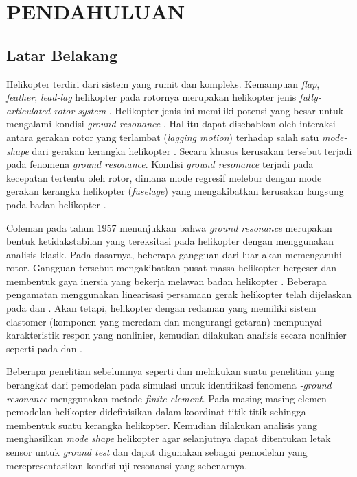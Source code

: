\chapter{PENDAHULUAN}
\label{chap:pendahuluan}

\section{Latar Belakang}
\label{sec:latarbelakang}
\thispagestyle{newchap}
Helikopter terdiri dari sistem yang rumit dan kompleks. Kemampuan \textit{flap}, \textit{feather}, \textit{lead-lag} helikopter pada rotornya merupakan helikopter jenis \textit{fully\hyp{}articulated rotor system} \cite{wagtendonk2006principles}. Helikopter jenis ini memiliki potensi yang besar untuk mengalami kondisi \textit{ground resonance} \cite{Eckert2007AnalyticalAA}. Hal itu dapat disebabkan oleh interaksi antara gerakan rotor yang terlambat (\textit{lagging motion}) terhadap salah satu \textit{mode-shape} dari gerakan kerangka helikopter \cite{Dzy1}. Secara khusus kerusakan tersebut terjadi pada fenomena \textit{ground resonance}.  Kondisi \textit{ground resonance} terjadi pada kecepatan tertentu oleh rotor, dimana mode regresif melebur dengan mode gerakan kerangka helikopter (\textit{fuselage}) yang mengakibatkan kerusakan langsung pada badan helikopter \cite{DASIL}. 

Coleman pada tahun 1957 menunjukkan bahwa \textit{ground resonance} merupakan bentuk ketidakstabilan yang tereksitasi pada helikopter dengan menggunakan analisis klasik. Pada dasarnya, beberapa gangguan dari luar akan memengaruhi rotor. Gangguan tersebut mengakibatkan pusat massa helikopter bergeser dan membentuk gaya inersia yang bekerja melawan badan helikopter \cite{Coleman}. Beberapa pengamatan menggunakan linearisasi persamaan gerak helikopter telah dijelaskan pada \cite{Friedmann} dan \cite{bielawa2006}. Akan tetapi, helikopter dengan redaman yang memiliki sistem elastomer (komponen yang meredam dan mengurangi getaran) mempunyai karakteristik respon yang nonlinier, kemudian dilakukan analisis secara nonlinier seperti pada \cite{KUNZ2002383} dan \cite{DASIL}. 

Beberapa penelitian sebelumnya seperti \cite{Ciavarella2018AnEH} dan \cite{Dzy1} melakukan suatu penelitian yang berangkat dari pemodelan pada simulasi untuk identifikasi fenomena \textit{\hyp{}ground resonance} menggunakan metode \textit{finite element}. Pada masing-masing elemen pemodelan helikopter didefinisikan dalam koordinat titik-titik sehingga membentuk suatu kerangka helikopter. Kemudian dilakukan analisis yang menghasilkan \textit{mode shape} helikopter agar selanjutnya dapat ditentukan letak sensor untuk \textit{ground test} dan dapat digunakan sebagai pemodelan yang merepresentasikan kondisi uji resonansi yang sebenarnya.

